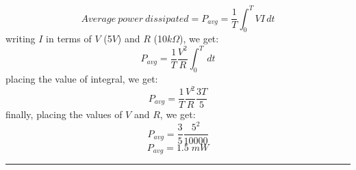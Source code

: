 \documentclass[table,xcdraw]{article}
\begin{document}
\begin{equation}
    Average\:power\:dissipated = P_{avg}=\frac{1}{T}\int_{0}^{T} VI \,dt
\end{equation}
writing $I$ in terms of $V$ (5$V$) and $R$ (10$k\Omega$), we get:
\begin{equation}
    P_{avg}=\frac{1}{T}\frac{V^2}{R}\int_{0}^{T}\,dt
\end{equation}
placing the value of integral, we get:
\begin{equation}
    P_{avg}=\frac{1}{T}\frac{V^2}{R}\frac{3T}{5}
\end{equation}
finally, placing the values of $V$ and $R$, we get:
\begin{equation}
    P_{avg}=\frac{3}{5}\frac{5^2}{10000}
\end{equation}
\begin{equation}
\boxed{
    P_{avg}=1.5\;mW }
\end{equation}
\vfill
\hrule
\end{document}
